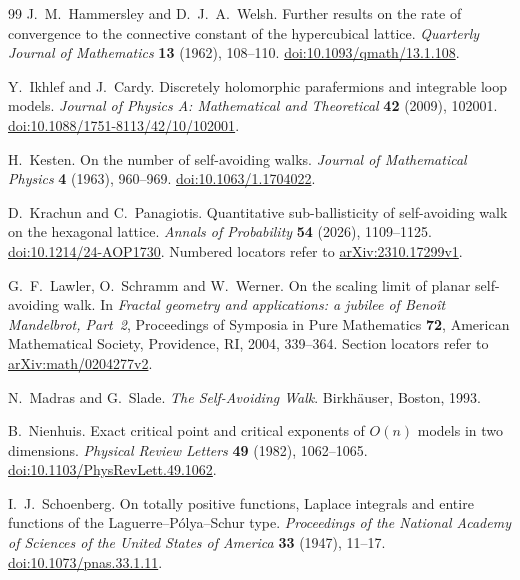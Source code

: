 \documentclass[11pt]{article}
\numberwithin{equation}{section}
\theoremstyle{definition}\newtheorem{definition}[theorem]{Definition}
\theoremstyle{remark}\newtheorem{remark}[theorem]{Remark}
\begin{document}
\begin{thebibliography}{99}
J.~M.~Hammersley and D.~J.~A.~Welsh.
Further results on the rate of convergence to the connective constant of
the hypercubical lattice.
\emph{Quarterly Journal of Mathematics} \textbf{13} (1962), 108--110.
\href{https://doi.org/10.1093/qmath/13.1.108}{doi:10.1093/qmath/13.1.108}.

Y.~Ikhlef and J.~Cardy.
Discretely holomorphic parafermions and integrable loop models.
\emph{Journal of Physics A: Mathematical and Theoretical} \textbf{42}
(2009), 102001.
\href{https://doi.org/10.1088/1751-8113/42/10/102001}{doi:10.1088/1751-8113/42/10/102001}.

H.~Kesten.
On the number of self-avoiding walks.
\emph{Journal of Mathematical Physics} \textbf{4} (1963), 960--969.
\href{https://doi.org/10.1063/1.1704022}{doi:10.1063/1.1704022}.

D.~Krachun and C.~Panagiotis.
Quantitative sub-ballisticity of self-avoiding walk on the hexagonal lattice.
\emph{Annals of Probability} \textbf{54} (2026), 1109--1125.
\href{https://doi.org/10.1214/24-AOP1730}{doi:10.1214/24-AOP1730}.
Numbered locators refer to \href{https://arxiv.org/abs/2310.17299v1}{arXiv:2310.17299v1}.

G.~F.~Lawler, O.~Schramm and W.~Werner.
On the scaling limit of planar self-avoiding walk.
In \emph{Fractal geometry and applications: a jubilee of Beno\^it Mandelbrot,
Part~2}, Proceedings of Symposia in Pure Mathematics \textbf{72},
American Mathematical Society, Providence, RI, 2004, 339--364.
Section locators refer to
\href{https://arxiv.org/abs/math/0204277v2}{arXiv:math/0204277v2}.

N.~Madras and G.~Slade.
\emph{The Self-Avoiding Walk}.
Birkh\"auser, Boston, 1993.

B.~Nienhuis.
Exact critical point and critical exponents of $O(n)$ models in two dimensions.
\emph{Physical Review Letters} \textbf{49} (1982), 1062--1065.
\href{https://doi.org/10.1103/PhysRevLett.49.1062}{doi:10.1103/PhysRevLett.49.1062}.

I.~J.~Schoenberg.
On totally positive functions, Laplace integrals and entire functions
of the Laguerre--P\'olya--Schur type.
\emph{Proceedings of the National Academy of Sciences of the United States
of America} \textbf{33} (1947), 11--17.
\href{https://doi.org/10.1073/pnas.33.1.11}{doi:10.1073/pnas.33.1.11}.


\end{thebibliography}
\end{document}
